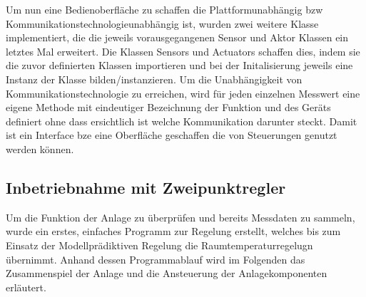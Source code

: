 

Um nun eine Bedienoberfläche zu schaffen die Plattformunabhängig bzw Kommunikationstechnologieunabhängig ist, wurden zwei weitere Klasse implementiert, die die jeweils vorausgegangenen Sensor und Aktor Klassen ein letztes Mal erweitert. Die Klassen Sensors und Actuators schaffen dies, indem sie die zuvor definierten Klassen importieren und bei der Initalisierung jeweils eine Instanz der Klasse bilden/instanzieren. Um die Unabhängigkeit von Kommunikationstechnologie zu erreichen, wird für jeden einzelnen Messwert eine eigene Methode mit eindeutiger Bezeichnung der Funktion und des Geräts definiert ohne dass ersichtlich ist welche Kommunikation darunter steckt. Damit ist ein Interface bze eine Oberfläche geschaffen die von Steuerungen genutzt werden können.



\subsection{Inbetriebnahme mit Zweipunktregler}
Um die Funktion der Anlage zu überprüfen und bereits Messdaten zu sammeln, wurde ein erstes, einfaches Programm zur Regelung erstellt, welches bis zum Einsatz der Modellprädiktiven Regelung die Raumtemperaturregelugn übernimmt. Anhand dessen Programmablauf wird im Folgenden das Zusammenspiel der Anlage und die Ansteuerung der Anlagekomponenten erläutert.

